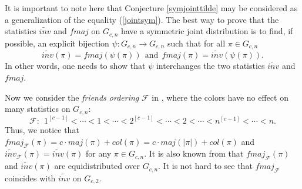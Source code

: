 \documentclass[a4paper,12pt]{article}
\begin{document}
It is important to note here that Conjecture \ref{symjointtilde} may be considered as a generalization of the equality (\ref{jointsym}). The best way to prove that the statistics $\widetilde{inv}$ and $fmaj$ on $G_{c,n}$ have a symmetric joint distribution is to find, if possible, an explicit bijection $\psi : G_{c,n} \rightarrow G_{c,n}$ such that for all $ \pi \in G_{c,n}$ 
$$\widetilde{inv}(\pi)=fmaj(\psi(\pi))~~\textrm{and}~~fmaj(\pi)=\widetilde{inv}(\psi(\pi)).$$
In other words, one needs to show that $\psi$ interchanges the two statistics $\widetilde{inv}$ and $fmaj$.



Now we consider the \textit{friends ordering} $\mathcal{F}$ in \cite{fire2005}, where the colors have no effect on many statistics on $G_{c,n}$:
\begin{equation*}
\mathcal{F}:~~1^{[c-1]}<\cdots<1<\cdots<2^{[c-1]}<\cdots<2<\cdots<n^{[c-1]}<\cdots < n.
\end{equation*}
Thus, we notice that $fmaj_{\mathcal{F}}(\pi)=c\cdot maj(\pi)+col(\pi)=c\cdot maj(|\pi|)+col(\pi)$ and $\widetilde{inv}_{\mathcal{F}}(\pi)=\widetilde{inv}(\pi)$ for any $\pi \in G_{c,n}$. It is also known from \cite{fire2005} that $fmaj_{\mathcal{F}}(\pi)$ and $\widetilde{inv}(\pi)$ are equidistributed over $G_{c,n}$. It is not hard to see that 
$fmaj_{\mathcal{F}}$ coincides with $\widetilde{inv}$ on $G_{c,2}$. 
\end{document}
